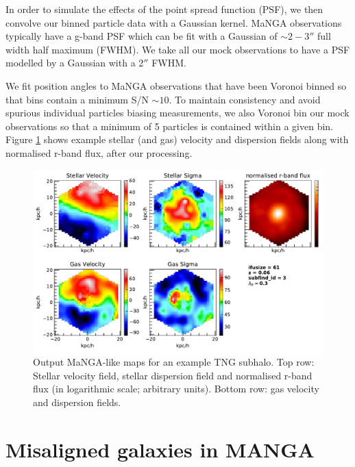 \documentclass[fleqn,usenatbib]{mnras}
\begin{document}
In order to simulate the effects of the point spread function (PSF), we then convolve our binned particle data with a Gaussian kernel. MaNGA observations typically have a g-band PSF which can be fit with a Gaussian of $\sim 2-3''$ full width half maximum (FWHM). We take all our mock observations to have a PSF modelled by a Gaussian with a 2$''$ FWHM. 

We fit position angles to MaNGA observations that have been Voronoi binned so that bins contain a minimum S/N $\sim 10$. To maintain consistency and avoid spurious individual particles biasing measurements, we also Voronoi bin our mock observations so that a minimum of 5 particles is contained within a given bin. Figure \ref{fig:example_obs} shows example stellar (and gas) velocity and dispersion fields along with normalised r-band flux, after our processing. 

\begin{figure}
	\includegraphics[width=\linewidth]{example_grid.pdf}
    \caption{Output MaNGA-like maps for an example TNG subhalo. Top row: Stellar velocity field, stellar dispersion field and normalised r-band flux (in logarithmic scale; arbitrary units). Bottom row: gas velocity and dispersion fields.}
    \label{fig:example_obs}
\end{figure}

\section{Misaligned galaxies in MANGA} \label{sec:manga_results}
\end{document}
